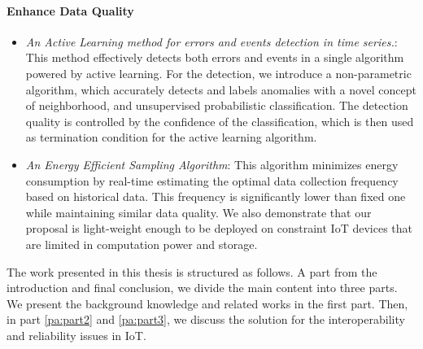 \paragraph{Enhance Data Quality}
\begin{itemize}
\item \textit{An Active Learning method for errors and events detection in time series.}:  This method effectively detects both errors and events in a single algorithm powered by active learning. For the detection, we introduce a non-parametric algorithm, which accurately detects and labels anomalies with a novel concept of neighborhood, and unsupervised probabilistic classification. The detection quality is controlled by the confidence of the classification, which is then used as termination condition for the active learning algorithm. 

\item \textit{An Energy Efficient Sampling Algorithm}: This algorithm minimizes energy consumption by real-time estimating the optimal data collection frequency based on historical data. This frequency is significantly lower than fixed one while maintaining similar data quality. We also demonstrate that our proposal is light-weight enough to be deployed on constraint IoT devices that are limited in computation power and storage.   
\end{itemize}

The work presented in this thesis is structured as follows. A part from the introduction and final conclusion, we divide the main content into three parts. We present the background knowledge and related works in the first part. Then, in part \ref{pa:part2} and \ref{pa:part3}, we discuss the solution for the interoperability and reliability issues in IoT.


